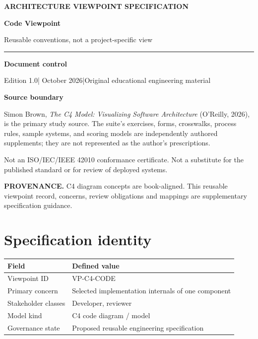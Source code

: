 \documentclass[10pt,letterpaper]{article}
\newcommand{\SourceNote}[1]{\par\smallskip\noindent\colorbox{C4Light}{\parbox{0.94\linewidth}{\footnotesize\textbf{PROVENANCE.} #1}}\par\medskip}
\newcommand{\DocStart}[3]{%
\begin{document}
\begin{titlepage}
\renewcommand{\thepage}{title-\arabic{page}}
\vspace*{0.55in}
{\sffamily\bfseries\small\color{C4Teal}#1}\par\vspace{0.24in}
{\sffamily\bfseries\fontsize{26}{31}\selectfont\color{C4Navy}#2}\par\vspace{0.18in}
{\large\color{C4Gray}#3}\par\vspace{0.4in}
\textcolor{C4Teal}{\rule{\linewidth}{1.15pt}}\par\vspace{0.24in}
\textbf{Document control}\par
Edition 1.0\quad|\quad 30 October 2026\quad|\quad Original educational engineering material\par
\vspace{0.17in}
\textbf{Source boundary}\par
Simon Brown, \emph{The C4 Model: Visualizing Software Architecture} (O'Reilly, 2026), is the primary study source. The suite's exercises, forms, crosswalks, process rules, sample systems, and scoring models are independently authored supplements; they are not represented as the author's prescriptions.\par
\vfill
{\small\color{C4Gray}Not an ISO/IEC/IEEE 42010 conformance certificate. Not a substitute for the published standard or for review of deployed systems.}\par
\end{titlepage}
}
\DocStart{ARCHITECTURE VIEWPOINT SPECIFICATION}{Code Viewpoint}{Reusable conventions, not a project-specific view}
\SourceNote{C4 diagram concepts are book-aligned. This reusable viewpoint record, concerns, review obligations and mappings are supplementary specification guidance.}
\section{Specification identity}
\begin{tabularx}{\linewidth}{@{}YY@{}}\toprule
\textbf{Field} & \textbf{Defined value} \\ \midrule
Viewpoint ID & VP-C4-CODE \\
Primary concern & Selected implementation internals of one component \\
Stakeholder classes & Developer, reviewer \\
Model kind & C4 code diagram / model \\
Governance state & Proposed reusable engineering specification \\
\bottomrule\end{tabularx}
\end{document}

